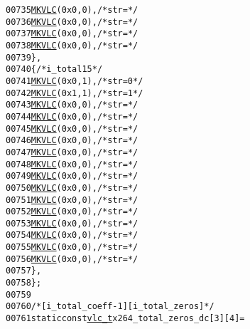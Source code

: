 \begin{footnotesize}
\begin{alltt}
00735         \hyperlink{vlc_8h_aa680b26539d09b5954221ff39a127faa}{MKVLC}( 0x0, 0 ), \textcolor{comment}{/* str= */}
00736         \hyperlink{vlc_8h_aa680b26539d09b5954221ff39a127faa}{MKVLC}( 0x0, 0 ), \textcolor{comment}{/* str= */}
00737         \hyperlink{vlc_8h_aa680b26539d09b5954221ff39a127faa}{MKVLC}( 0x0, 0 ), \textcolor{comment}{/* str= */}
00738         \hyperlink{vlc_8h_aa680b26539d09b5954221ff39a127faa}{MKVLC}( 0x0, 0 ), \textcolor{comment}{/* str= */}
00739     \},
00740     \{ \textcolor{comment}{/* i\_total 15 */}
00741         \hyperlink{vlc_8h_aa680b26539d09b5954221ff39a127faa}{MKVLC}( 0x0, 1 ), \textcolor{comment}{/* str=0 */}
00742         \hyperlink{vlc_8h_aa680b26539d09b5954221ff39a127faa}{MKVLC}( 0x1, 1 ), \textcolor{comment}{/* str=1 */}
00743         \hyperlink{vlc_8h_aa680b26539d09b5954221ff39a127faa}{MKVLC}( 0x0, 0 ), \textcolor{comment}{/* str= */}
00744         \hyperlink{vlc_8h_aa680b26539d09b5954221ff39a127faa}{MKVLC}( 0x0, 0 ), \textcolor{comment}{/* str= */}
00745         \hyperlink{vlc_8h_aa680b26539d09b5954221ff39a127faa}{MKVLC}( 0x0, 0 ), \textcolor{comment}{/* str= */}
00746         \hyperlink{vlc_8h_aa680b26539d09b5954221ff39a127faa}{MKVLC}( 0x0, 0 ), \textcolor{comment}{/* str= */}
00747         \hyperlink{vlc_8h_aa680b26539d09b5954221ff39a127faa}{MKVLC}( 0x0, 0 ), \textcolor{comment}{/* str= */}
00748         \hyperlink{vlc_8h_aa680b26539d09b5954221ff39a127faa}{MKVLC}( 0x0, 0 ), \textcolor{comment}{/* str= */}
00749         \hyperlink{vlc_8h_aa680b26539d09b5954221ff39a127faa}{MKVLC}( 0x0, 0 ), \textcolor{comment}{/* str= */}
00750         \hyperlink{vlc_8h_aa680b26539d09b5954221ff39a127faa}{MKVLC}( 0x0, 0 ), \textcolor{comment}{/* str= */}
00751         \hyperlink{vlc_8h_aa680b26539d09b5954221ff39a127faa}{MKVLC}( 0x0, 0 ), \textcolor{comment}{/* str= */}
00752         \hyperlink{vlc_8h_aa680b26539d09b5954221ff39a127faa}{MKVLC}( 0x0, 0 ), \textcolor{comment}{/* str= */}
00753         \hyperlink{vlc_8h_aa680b26539d09b5954221ff39a127faa}{MKVLC}( 0x0, 0 ), \textcolor{comment}{/* str= */}
00754         \hyperlink{vlc_8h_aa680b26539d09b5954221ff39a127faa}{MKVLC}( 0x0, 0 ), \textcolor{comment}{/* str= */}
00755         \hyperlink{vlc_8h_aa680b26539d09b5954221ff39a127faa}{MKVLC}( 0x0, 0 ), \textcolor{comment}{/* str= */}
00756         \hyperlink{vlc_8h_aa680b26539d09b5954221ff39a127faa}{MKVLC}( 0x0, 0 ), \textcolor{comment}{/* str= */}
00757     \},
00758 \};
00759 
00760 \textcolor{comment}{/* [i\_total\_coeff-1][i\_total\_zeros] */}
00761 \textcolor{keyword}{static} \textcolor{keyword}{const} \hyperlink{structvlc__t}{vlc_t} x264\_total\_zeros\_dc[3][4] =

\end{alltt}
\end{footnotesize}
